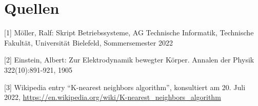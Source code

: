 \documentclass[12pt,a4paper]{article}
\begin{document}
\newpage
\thispagestyle{empty}

\section*{Quellen}

{\parindent0pt%
  
[1] Möller, Ralf: Skript Betriebssysteme, AG Technische Informatik,
Technische Fakultät, Universität Bielefeld, Sommersemester 2022

[2] Einstein, Albert: Zur Elektrodynamik bewegter K{\"o}rper. Annalen
der Physik 322(10):891-921, 1905

[3] Wikipedia entry ``K-nearest neighbors algorithm'', konsultiert am
20. Juli 2022,
\url{https://en.wikipedia.org/wiki/K-nearest_neighbors_algorithm}

}
\end{document}
